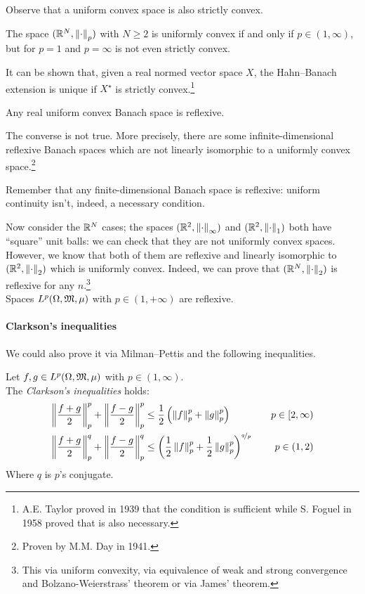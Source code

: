 Observe that a uniform convex space is also strictly convex.

The space $(\mathbb R^N, \left\lVert\cdot\right\rVert_p)$ with $N \geq 2$ is uniformly convex if and only if $p \in (1,\infty)$, but for $p=1$ and $p=\infty$ is not even strictly convex.

It can be shown that, given a real normed vector space $X$, the Hahn--Banach extension is unique if $X^\star$ is strictly convex.\footnote{A.E. Taylor proved in 1939 that the condition is sufficient while S. Foguel in 1958 proved that is also necessary.}

\begin{theo}\label{theo-milman-pettis}
	Any real uniform convex Banach space is reflexive.
\end{theo}

The converse is not true. More precisely, there are some infinite-dimensional reflexive Banach spaces which are not linearly isomorphic to a uniformly convex space.\footnote{Proven by M.M. Day in 1941.}

Remember that any finite-dimensional Banach space is reflexive: uniform continuity isn't, indeed, a necessary condition.

Now consider the $\mathbb R^N$ cases; the spaces $(\mathbb R^2, \left\lVert\cdot\right\rVert_\infty)$ and $(\mathbb R^2, \left\lVert\cdot\right\rVert_1)$ both have ``square'' unit balls: we can check that they are not uniformly convex spaces.\\
However, we know that both of them are reflexive and linearly isomorphic to $(\mathbb R^2, \left\lVert\cdot\right\rVert_2)$ which is uniformly convex.
Indeed,	we can prove that $(\mathbb R^N, \left\lVert\cdot\right\rVert_2)$ is reflexive for any $n$.\footnote{This via uniform convexity, via equivalence of weak and strong convergence and Bolzano-Weierstrass' theorem or via James' theorem.}\\
Spaces $L^p(\Omega,\mathfrak M,\mu)$ with $p \in (1,+\infty)$ are reflexive.

\paragraph{Clarkson's inequalities}We could also prove it via Milman--Pettis and the following inequalities.

\begin{prop}
	Let $f,g \in L^p(\Omega, \mathfrak M, \mu)$ with $p \in (1, \infty)$.\\
	The \emph{Clarkson's inequalities} holds:
	\begin{align*}
		\left\lVert\frac{f+g}{2}\right\rVert_p^p +
		\left\lVert\frac{f-g}{2}\right\rVert_p^p
		&\le \frac 1 2
		\left( \left\lVert f\right\rVert_p^p + \left\lVert g\right\rVert_p^p \right) \quad
		&p \in [2,\infty)
		\\
		\left\lVert\frac{f+g}{2}\right\rVert_p^q + 
		\left\lVert\frac{f-g}{2}\right\rVert_p^q
		&\le \left( \frac 1 2 \left\lVert f\right\rVert_p^p + 
		\frac 1 2 \left\lVert g\right\rVert_p^p \right)^{\nicefrac q p} \quad
		& p \in (1,2)		
	\end{align*}
	Where $q$ is $p$'s conjugate.
\end{prop}


